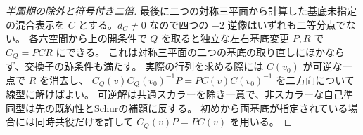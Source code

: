 \begin{proof}[半周期の除外と符号付き二倍]
最後に二つの対称三平面から計算した基底未指定の混合表示を $C$ とする。$d_C\ne0$ なので四つの $-2$ 逆像はいずれも二等分点でない。
各六空間から上の開条件で $Q$ を取ると独立な左右基底変更 $P,R$ で $C_Q=P C R$ にできる。
これは対称三平面の二つの基底の取り直しにほかならず、交換子の跡条件も満たす。
実際の行列を求める際には $C(v_0)$ が可逆な一点で $R$ を消去し、
$C_Q(v)C_Q(v_0)^{-1} P=P C(v)C(v_0)^{-1}$ を二方向について線型に解けばよい。
可逆解は共通スカラーを除き一意で、非スカラーな自己準同型は先の既約性とSchurの補題に反する。
初めから両基底が指定されている場合には同時共役だけを許して $C_Q(v)P=P C(v)$ を用いる。
\end{proof}
